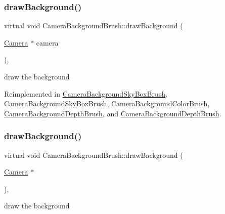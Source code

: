 \subsubsection{\texorpdfstring{draw\+Background()}{drawBackground()}\hspace{0.1cm}{\footnotesize\ttfamily [1/2]}}
{\footnotesize\ttfamily virtual void Camera\+Background\+Brush\+::draw\+Background (\begin{DoxyParamCaption}\item[{\hyperlink{classCamera}{Camera} $\ast$}]{camera }\end{DoxyParamCaption})\hspace{0.3cm}{\ttfamily [inline]}, {\ttfamily [virtual]}}

draw the background 

Reimplemented in \hyperlink{classCameraBackgroundSkyBoxBrush_ac7f69194164c51712f6b2d556ce795c7}{Camera\+Background\+Sky\+Box\+Brush}, \hyperlink{classCameraBackgroundSkyBoxBrush_aa01f6019518a0428872e8307962647fa}{Camera\+Background\+Sky\+Box\+Brush}, \hyperlink{classCameraBackgroundColorBrush_aa07e5c7ea9d5c233c51920bf75d1381b}{Camera\+Background\+Color\+Brush}, \hyperlink{classCameraBackgroundDepthBrush_aa87e44c303dcf8e2560ee56d5c8fee58}{Camera\+Background\+Depth\+Brush}, and \hyperlink{classCameraBackgroundDepthBrush_afe438cdd7dbcf77d6421ec50224579d1}{Camera\+Background\+Depth\+Brush}.

\mbox{\label{classCameraBackgroundBrush_a4632a03b7138aaed433ba6340df6ed5c}} 
\subsubsection{\texorpdfstring{draw\+Background()}{drawBackground()}\hspace{0.1cm}{\footnotesize\ttfamily [2/2]}}
{\footnotesize\ttfamily virtual void Camera\+Background\+Brush\+::draw\+Background (\begin{DoxyParamCaption}\item[{\hyperlink{classCamera}{Camera} $\ast$}]{ }\end{DoxyParamCaption})\hspace{0.3cm}{\ttfamily [inline]}, {\ttfamily [virtual]}}

draw the background 

